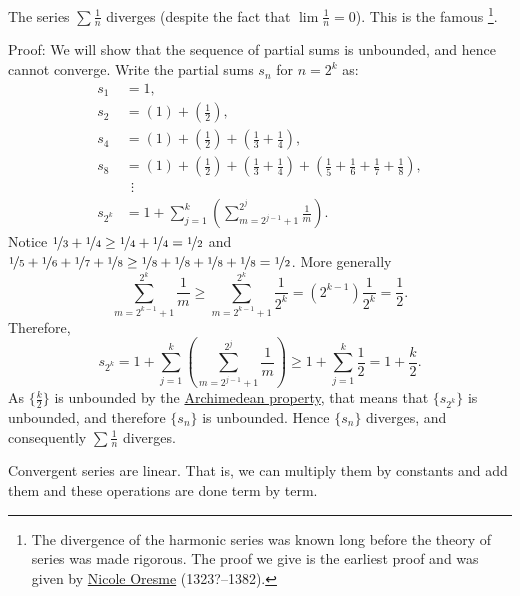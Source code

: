 \begin{example} \label{example:harmonicseries}
The series $\sum \frac{1}{n}$ diverges (despite the fact that $\lim
\frac{1}{n} = 0$).  This is the famous \emph{}%
\footnote{The divergence of the harmonic series was known 
long before the theory of series was made rigorous.  The proof we
give is the earliest proof and was given by
\href{https://en.wikipedia.org/wiki/Oresme}{Nicole Oresme}
(1323?--1382).}.

Proof: We will show that the sequence of partial sums is unbounded, and hence
cannot converge.
Write the partial sums $s_n$ for $n = 2^k$ as:
\begin{align*}
 s_1 & = 1 , \\
 s_2 & = \left( 1 \right) + \left( \frac{1}{2} \right) , \\
 s_4 & = \left( 1 \right) + \left( \frac{1}{2} \right) +
        \left( \frac{1}{3} + \frac{1}{4} \right) , \\
 s_8 & = \left( 1 \right) + \left( \frac{1}{2} \right) +
        \left( \frac{1}{3} + \frac{1}{4} \right) +
        \left( \frac{1}{5} + \frac{1}{6} + \frac{1}{7} + \frac{1}{8} \right) , \\
& ~~ \vdots \\
 s_{2^k} & = 
1 + 
\sum_{j=1}^k
\left(
\sum_{m=2^{j-1}+1}^{2^j} \frac{1}{m}
\right) .
\end{align*}
Notice $\nicefrac{1}{3} + \nicefrac{1}{4} \geq \nicefrac{1}{4} + \nicefrac{1}{4} =
\nicefrac{1}{2}$ and
$\nicefrac{1}{5} + \nicefrac{1}{6} + \nicefrac{1}{7} + \nicefrac{1}{8}
\geq \nicefrac{1}{8} + \nicefrac{1}{8} + \nicefrac{1}{8} + \nicefrac{1}{8} =
\nicefrac{1}{2}$.  More generally
\begin{equation*}
\sum_{m=2^{k-1}+1}^{2^k} \frac{1}{m}
\geq
\sum_{m=2^{k-1}+1}^{2^k} \frac{1}{2^k}
=
(2^{k-1}) \frac{1}{2^k} = \frac{1}{2} .
\end{equation*}
Therefore,
\begin{equation*}
s_{2^k} = 
1 + 
\sum_{j=1}^k
\left(
\sum_{m=2^{j-1}+1}^{2^j} \frac{1}{m}
\right) 
\geq
1 + \sum_{j=1}^k \frac{1}{2} = 1 + \frac{k}{2} .
\end{equation*}
As $\{ \frac{k}{2} \}$ is unbounded by the
\hyperref[thm:arch:i]{Archimedean property}, that means that
$\{ s_{2^k} \}$ is unbounded, and therefore $\{ s_n \}$ is unbounded.
Hence $\{ s_n \}$ diverges, and consequently $\sum \frac{1}{n}$ diverges.
\end{example}

Convergent series are linear.  That is, we can multiply them by constants
and add them and these operations are done term by term.

